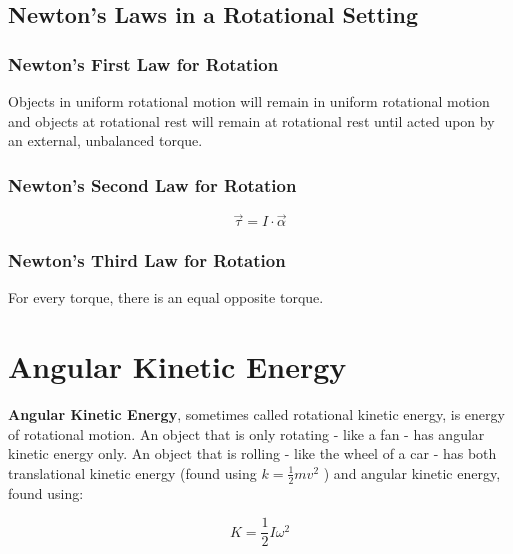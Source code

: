 	
	
	
	
	
	
	\subsection{Newton's Laws in a Rotational Setting}
	
	\subsubsection{Newton's First Law for Rotation}
	Objects in uniform rotational motion will remain in uniform rotational motion and objects at rotational rest will remain at rotational rest until acted upon by an external, unbalanced torque.  
	
	\subsubsection{Newton's Second Law for Rotation}
			\begin{mdframed}[backgroundcolor=orange!20!white]
		\begin{equation}
			\vec{\tau} = I \cdot \vec{\alpha}
			\label{equation:newtonssecondrotational}
		\end{equation}
	\end{mdframed}
	
	\subsubsection{Newton's Third Law for Rotation}
	For every torque, there is an equal opposite torque.
	
	
	\section{Angular Kinetic Energy}
	\textbf{Angular Kinetic Energy}, sometimes called rotational kinetic energy, is energy of rotational motion.  An object that is only rotating - like a fan - has angular kinetic energy only.  An object that is rolling - like the wheel of a car - has both translational kinetic energy (found using $k = \frac{1}{2}mv^2$ ) and angular kinetic energy, found using:
	
				\begin{mdframed}[backgroundcolor=orange!20!white]
		\begin{equation}
			K = \frac{1}{2}I\omega^2
			\label{equation:rotationalkineticenergy}
		\end{equation}
	\end{mdframed}
	
